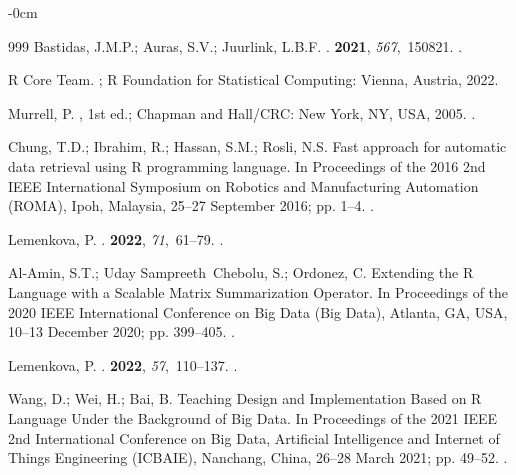 \documentclass[jimaging,article,accept,pdftex,moreauthors]{Definitions/mdpi}
\begin{document}
\begin{adjustwidth}{-\extralength}{0cm}
\begin{thebibliography}{999}
Bastidas, J.M.P.; Auras, S.V.; Juurlink, L.B.F.
.
 {\bf 2021}, {\em 567},~150821.
.

{R Core Team}.
;
\newblock R Foundation for Statistical Computing: Vienna, Austria,  2022.

Murrell, P.
, 1st ed.; Chapman and Hall/CRC: New York, NY, USA,  2005.
.

Chung, T.D.; Ibrahim, R.; Hassan, S.M.; Rosli, N.S.
\newblock Fast approach for automatic data retrieval using R programming
  language.
\newblock In Proceedings of the 2016 2nd IEEE International Symposium on
  Robotics and Manufacturing Automation (ROMA), Ipoh, Malaysia, 25--27 September 2016; pp. 1--4.
.

Lemenkova, P.
.
 {\bf 2022}, {\em
  71},~61--79.
.

Al-Amin, S.T.; Uday Sampreeth~Chebolu, S.; Ordonez, C.
\newblock Extending the R Language with a Scalable Matrix Summarization
  Operator.
\newblock In Proceedings of the 2020 IEEE International Conference on Big Data
  (Big Data), Atlanta, GA, USA, 10--13 December 2020; pp. 399--405.
. %

Lemenkova, P.
.
 {\bf 2022}, {\em 57},~110--137.
.

Wang, D.; Wei, H.; Bai, B.
\newblock Teaching Design and Implementation Based on R Language Under the
  Background of Big Data.
\newblock In Proceedings of the 2021 IEEE 2nd International Conference on Big
  Data, Artificial Intelligence and Internet of Things Engineering (ICBAIE),
  Nanchang, China, 26--28 March  2021; pp. 49--52.
.


\end{thebibliography}
\end{adjustwidth}
\end{document}
